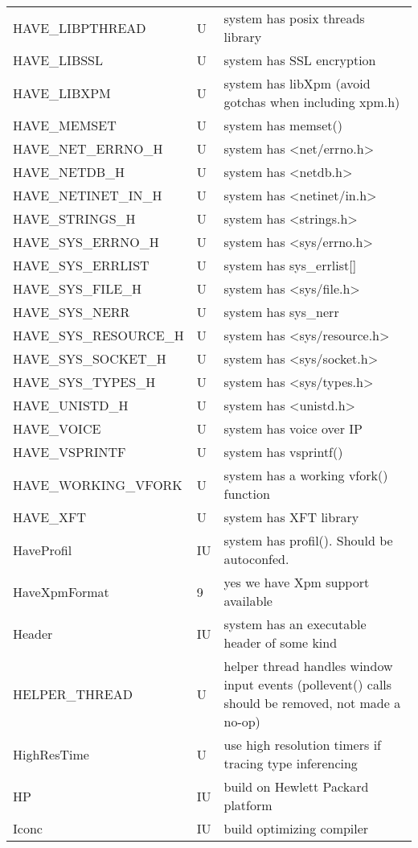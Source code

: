 \begin{xtabular}{|m{1.8in}|m{0.5in}|m{4.0in}|}
HAVE\_LIBPTHREAD & U & system has posix threads library \\
HAVE\_LIBSSL & U & system has SSL encryption \\
HAVE\_LIBXPM & U & system has libXpm (avoid gotchas when including xpm.h) \\
HAVE\_MEMSET & U & system has memset() \\
HAVE\_NET\_ERRNO\_H & U & system has <net/errno.h> \\
HAVE\_NETDB\_H & U & system has <netdb.h> \\
HAVE\_NETINET\_IN\_H & U & system has <netinet/in.h> \\
HAVE\_STRINGS\_H & U & system has <strings.h> \\
HAVE\_SYS\_ERRNO\_H & U & system has <sys/errno.h> \\
HAVE\_SYS\_ERRLIST & U & system has sys\_errlist[] \\
HAVE\_SYS\_FILE\_H & U & system has <sys/file.h> \\
HAVE\_SYS\_NERR & U & system has sys\_nerr \\
HAVE\_SYS\_RESOURCE\_H & U & system has <sys/resource.h> \\
HAVE\_SYS\_SOCKET\_H & U & system has <sys/socket.h> \\
HAVE\_SYS\_TYPES\_H & U & system has <sys/types.h> \\
HAVE\_UNISTD\_H & U & system has <unistd.h> \\
HAVE\_VOICE & U & system has voice over IP \\
HAVE\_VSPRINTF & U & system has vsprintf() \\
HAVE\_WORKING\_VFORK & U & system has a working vfork() function \\
HAVE\_XFT & U & system has XFT library \\
HaveProfil & IU & system has profil(). Should be autoconfed. \\
HaveXpmFormat & 9 & yes we have Xpm support available \\
Header & IU & system has an executable header of some kind \\
HELPER\_THREAD & U & helper thread handles window input events
	(pollevent() calls should be removed, not made a no-op) \\
HighResTime & U & use high resolution timers if tracing type inferencing \\
HP & IU & build on Hewlett Packard platform \\
Iconc & IU & build optimizing compiler \\

\end{xtabular}
